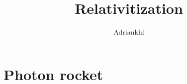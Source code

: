 \documentclass[12pt, letterpaper]{article}
\title{Relativitization}
\author{Adriankhl}
\begin{document}
\begin{titlepage}
\maketitle
\end{titlepage}

\section{Photon rocket}
\end{document}

